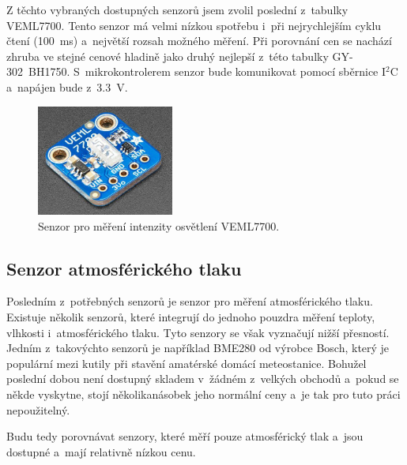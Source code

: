 Z těchto vybraných dostupných senzorů jsem zvolil poslední z~tabulky VEML7700. Tento senzor má velmi nízkou spotřebu i~při nejrychlejším cyklu čtení (\SI{100}{\milli\second}) a~největší rozsah možného měření. Při porovnání cen se nachází zhruba ve stejné cenové hladině jako druhý nejlepší z~této tabulky GY-302~BH1750. S~mikrokontrolerem senzor bude komunikovat pomocí sběrnice I$^2$C a~napájen bude z~\SI{3,3}{\volt}.

\begin{figure}[h!]
    \centering
    \includegraphics[width=0.4\textwidth]{obrazky/veml7700.png}
    \caption{Senzor pro měření intenzity osvětlení VEML7700. \cite{VEML7700}}
    \label{fig_VEML7700}
\end{figure}

\subsection{Senzor atmosférického tlaku}

Posledním z~potřebných senzorů je senzor pro měření atmosférického tlaku. Existuje několik senzorů, které integrují do jednoho pouzdra měření teploty, vlhkosti i~atmosférického tlaku. Tyto senzory se však vyznačují nižší přesností. Jedním z~takovýchto senzorů je například BME280 od výrobce Bosch, který je populární mezi kutily při stavění amatérské domácí meteostanice. Bohužel poslední dobou není dostupný skladem v~žádném z~velkých obchodů a~pokud se někde vyskytne, stojí několikanásobek jeho normální ceny a~je tak pro tuto práci nepoužitelný.

Budu tedy porovnávat senzory, které měří pouze atmosférický tlak a~jsou dostupné a~mají relativně nízkou cenu.

